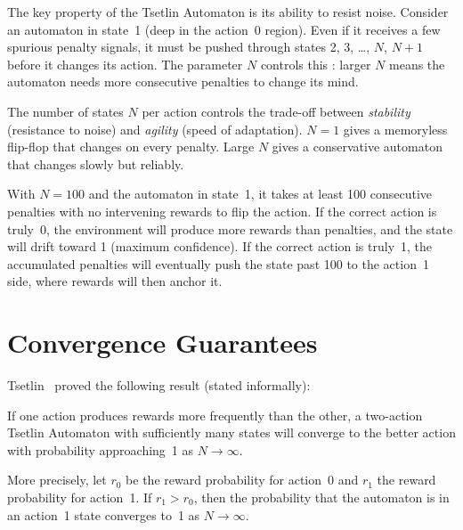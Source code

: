 The key property of the Tsetlin Automaton is its ability to resist
noise. Consider an automaton in state~1 (deep in the action~0 region).
Even if it receives a few spurious penalty signals, it must be pushed
through states 2, 3, \ldots, $N$, $N{+}1$ before it changes its
action. The parameter $N$ controls this : larger
$N$ means the automaton needs more consecutive penalties to change its
mind.

\begin{keyinsight}
The number of states $N$ per action controls the trade-off between
\emph{stability} (resistance to noise) and \emph{agility} (speed of
adaptation). $N = 1$ gives a memoryless flip-flop that changes on
every penalty. Large $N$ gives a conservative automaton that changes
slowly but reliably.
\end{keyinsight}

\begin{example}
With $N = 100$ and the automaton in state~1, it takes at least 100
consecutive penalties with no intervening rewards to flip the
action. If the correct action is truly~0, the environment will
produce more rewards than penalties, and the state will drift toward
1 (maximum confidence). If the correct action is truly~1, the
accumulated penalties will eventually push the state past 100 to the
action~1 side, where rewards will then anchor it.
\end{example}


\section{Convergence Guarantees}
\label{sec:convergence}

Tsetlin~\cite{tsetlin1961} proved the following result (stated informally):

\begin{theorem}
\label{thm:tsetlin-convergence}
If one action produces rewards more frequently than the other, a
two-action Tsetlin Automaton with sufficiently many states will
converge to the better action with probability approaching~1 as
$N \to \infty$.
\end{theorem}

More precisely, let $r_0$ be the reward probability for action~0 and
$r_1$ the reward probability for action~1. If $r_1 > r_0$, then the
probability that the automaton is in an action~1 state converges to~1
as $N \to \infty$.

